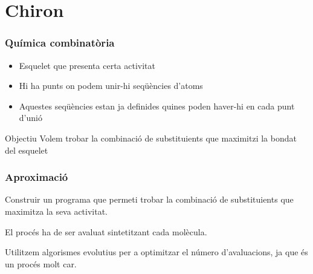 \documentclass{beamer}
\begin{document}

\section{Chiron} %
\label{sec:Chiron}
\begin{frame}
	\frametitle{Química combinatòria}
	\begin{itemize}
		\item Esquelet que presenta certa activitat
		\item Hi ha punts on podem unir-hi seqüències d'atoms
		\item Aquestes seqüències estan ja definides quines poden haver-hi en cada punt d'unió
	\end{itemize}
	\pause
	\begin{block}{Objectiu}
		Volem trobar la combinació de substituients que maximitzi la bondat del esquelet
	\end{block}
\end{frame}

\begin{frame}
	\frametitle{Aproximació}
	Construir un programa que permeti trobar la combinació de substituients que
	maximitza la seva activitat.

	El procés ha de ser avaluat sintetitzant cada molècula.

	Utilitzem algorismes evolutius per a optimitzar el número d'avaluacions, ja
	que és un procés molt car.


\end{frame}
\end{document}
